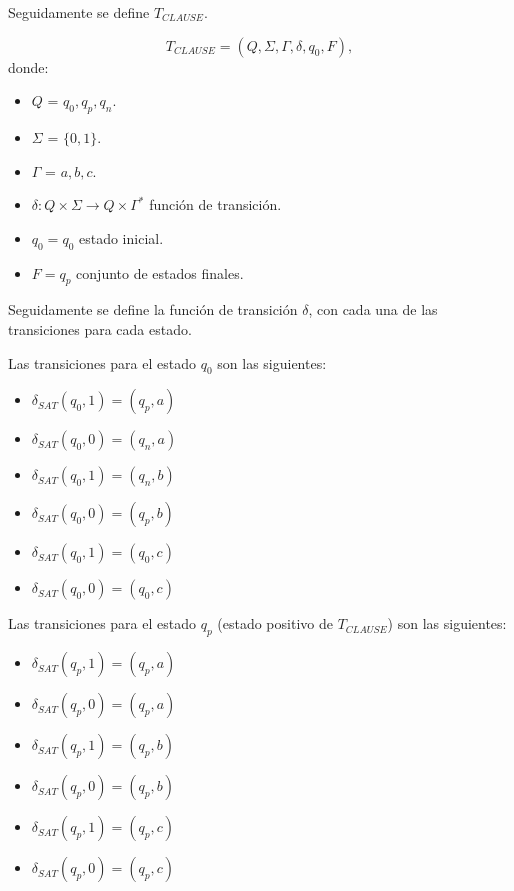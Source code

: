 \documentclass[12pt]{article}
\begin{document}
Seguidamente se define $T_{CLAUSE}$.

\[
    T_{CLAUSE} = (Q, {\Sigma}, \Gamma, \delta, q_{0}, F),
\]
donde:
\begin{itemize}
    \item \(Q\) = ${q_0,q_p,q_n}$.
    \item \(\Sigma\) = $\{0,1\}$.
    \item \(\Gamma\) = ${a,b,c}$.
    \item \(\delta: Q \times \Sigma \to Q \times \Gamma^*\) función de transición.
    \item \(q_{0} = q_0\) estado inicial.
    \item \(F={q_p}\) conjunto de estados finales.
\end{itemize}

Seguidamente se define la función de transición $\delta$, con cada una de las transiciones para cada estado.

Las transiciones para el estado $q_0$ son las siguientes:
\begin{multicols}{2}
    \begin{itemize}
        \item $\delta_{SAT}(q_0,1)=(q_p,a)$
        \item $\delta_{SAT}(q_0,0)=(q_n,a)$
        \item $\delta_{SAT}(q_0,1)=(q_n,b)$
        \item $\delta_{SAT}(q_0,0)=(q_p,b)$
        \item $\delta_{SAT}(q_0,1)=(q_0,c)$
        \item $\delta_{SAT}(q_0,0)=(q_0,c)$
    \end{itemize}
\end{multicols}

Las transiciones para el estado $q_p$ (estado positivo de $T_{CLAUSE}$) son las siguientes:
\begin{multicols}{2}
    \begin{itemize}
        \item $\delta_{SAT}(q_{p},1)=(q_{p},a)$
        \item $\delta_{SAT}(q_{p},0)=(q_{p},a)$
        \item $\delta_{SAT}(q_{p},1)=(q_{p},b)$
        \item $\delta_{SAT}(q_{p},0)=(q_{p},b)$
        \item $\delta_{SAT}(q_{p},1)=(q_{p},c)$
        \item $\delta_{SAT}(q_{p},0)=(q_{p},c)$
    \end{itemize}
\end{multicols}
\end{document}
